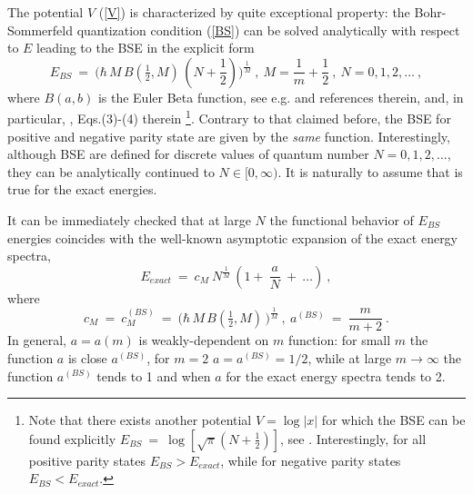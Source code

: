\documentclass[preprint,preprintnumbers,amsmath,amssymb]{revtex4}
\newcommand{\rar}{\rightarrow}
\begin{document}
The potential $V$ (\ref{V}) is characterized by quite exceptional property: the Bohr-Sommerfeld quantization condition (\ref{BS}) can be solved analytically with respect to $E$ leading to the BSE in the explicit form
\begin{equation}
\label{EBS}
		E_{BS}\ =\ \bigg({\hbar}\,M\,B\left(\tfrac{1}{2},M\right)\,
		\left(N+\frac{1}{2}\right)\bigg)^{\frac{1}{M}}\ ,
		\ M=\frac{1}{m}+\frac{1}{2}\ ,\ N=0,1,2,\ldots \ ,
\end{equation}
where $B(a,b)$ is the Euler Beta function, see e.g. \cite{Voros:1999} and references therein, and, in particular, \cite{Dorey-Tateo:1999}, Eqs.(3)-(4) therein \footnote{Note that there exists another potential $V = \log |x|$ for which the BSE can be found explicitly
$E_{BS}\ =\ \log \left[\sqrt \pi (N+\frac{1}{2})\right]$, see \cite{Gesztesy:1978}.
Interestingly, for all positive parity states $E_{BS} > E_{exact}$, while for negative parity states $E_{BS} < E_{exact}$.}. Contrary to that claimed before, the BSE for positive and negative parity state are given by the {\it same} function. Interestingly, although BSE are defined for discrete values of quantum number $N=0,1,2,\ldots$, they can be analytically continued to $N \in [0,\infty)$. It is naturally to assume that is true for the exact energies.

It can be immediately checked that at large $N$ the functional behavior of $E_{BS}$ energies coincides with the well-known asymptotic expansion of the exact energy spectra,
\begin{equation}
\label{1/N}
      E_{exact}\ = \ c_M\ N^{\frac{1}{M}}\,(1 +\ \frac{a}{N}\ +\ \ldots ) \ ,
\end{equation}
where
\[
      c_M\ =\ c^{(BS)}_M\ =\ \bigg({\hbar}\,M\,B\left(\tfrac{1}{2},M\right)\,
		\bigg)^{\frac{1}{M}}\ ,\ a^{(BS)}\ =\ \frac{m}{m+2}\ .
\]
In general, $a=a(m)$ is weakly-dependent on $m$ function: for small $m$ the function $a$ is close $a^{(BS)}$, for $m=2$ $a=a^{(BS)}=1/2$, while at large $m\rar\infty$ the function $a^{(BS)}$ tends to 1 and when $a$ for the exact energy spectra tends to 2. 
\end{document}
